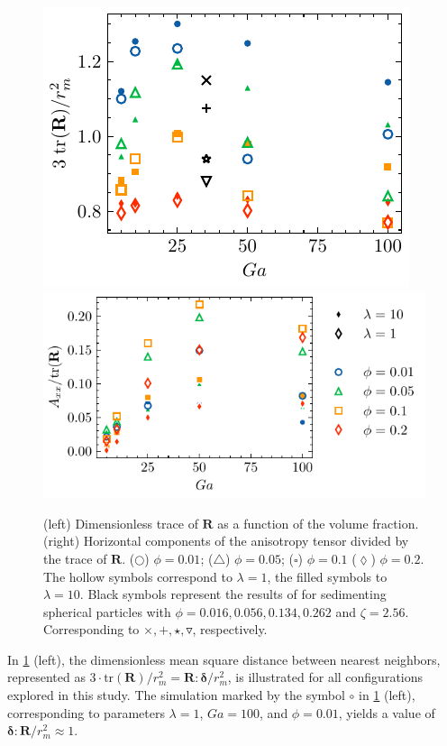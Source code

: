 \begin{figure}[h!]
    \centering
    \includegraphics[height=0.3\textwidth]{image/HOMOGENEOUS_NEW/PA/trR.pdf}
    \includegraphics[height=0.3\textwidth]{image/HOMOGENEOUS_NEW/PA/Axx.pdf}
    \caption{
        (left) Dimensionless trace of $\textbf{R}$ as a function of the volume fraction.%
        (right) Horizontal components of the anisotropy tensor divided by the trace of $\textbf{R}$. %
    ($\pmb\bigcirc$) $\phi = 0.01$; ($\pmb\triangle$) $ \phi = 0.05$; ($\pmb\square$) $\phi = 0.1$ ($\pmb\lozenge$) $\phi = 0.2$.
    The hollow symbols correspond to $\lambda = 1$, the filled symbols to $\lambda = 10$.
    Black symbols represent the results of \citet{zhang2023evolution} for sedimenting spherical particles with $\phi = 0.016,0.056,0.134,0.262$ and $\zeta = 2.56$. %
    Corresponding to $\pmb\times,\pmb +, \pmb\star , \pmb\triangledown$, respectively.
    }
    \label{fig:A}
\end{figure}
In \ref{fig:A} (left), the dimensionless mean square distance between nearest neighbors, represented as $3\cdot\text{tr}(\textbf{R})/r_m^2 = \textbf{R}:\bm\delta/r_m^2$, is illustrated for all configurations explored in this study. 
The simulation marked by the symbol \textcolor{col1}{$\pmb\circ$} in \ref{fig:A} (left), corresponding to parameters $\lambda = 1$, $Ga = 100$, and $\phi = 0.01$, yields a value of $\bm\delta:\textbf{R}/r_m^2 \approx 1$. 
